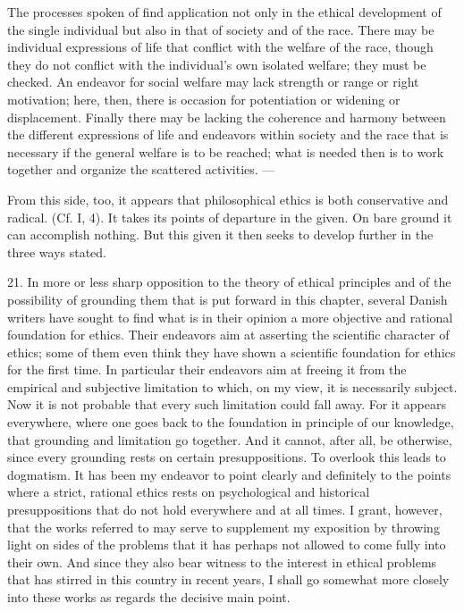 \documentclass[12pt,a4paper,openany]{book}
\newcommand{\opage}[1]{\marginnote{\footnotesize\textit{[#1]}}}
\begin{document}
The processes spoken of find application not only in the ethical development of the single
individual but also in that of society and of the race. There may be individual expressions of life
that conflict with the welfare of the race, though they do not conflict with the individual's own
\opage{66}isolated welfare; they must be checked. An endeavor for social welfare may lack strength or range
or right motivation; here, then, there is occasion for potentiation or widening or displacement.
Finally there may be lacking the coherence and harmony between the different expressions of life and
endeavors within society and the race that is necessary if the general welfare is to be reached; what
is needed then is to work together and organize the scattered activities. ---

From this side, too, it appears that philosophical ethics is both conservative and radical. (Cf. I,
4). It takes its points of departure in the given. On bare ground it can accomplish nothing. But this
given it then seeks to develop further in the three ways stated.

21. In more or less sharp opposition to the theory of ethical principles and of the possibility of
grounding them that is put forward in this chapter, several Danish writers have sought to find what is
in their opinion a more objective and rational foundation for ethics. Their endeavors aim at asserting
the scientific character of ethics; some of them even think they have shown a scientific foundation
for ethics for the first time. In particular their endeavors aim at freeing it from the empirical and
subjective limitation to which, on my view, it is necessarily subject. Now it is not probable that
every such limitation could fall away. For it appears everywhere, where one goes back to the
foundation in principle of our knowledge, that grounding and limitation go together. And it cannot,
after all, be otherwise, since every grounding rests on certain presuppositions. To overlook this
leads to dogmatism. It has been my endeavor to point clearly and definitely to the points where a
strict, rational ethics rests on psychological and historical presuppositions that do not hold
everywhere and at all times. I grant, however, that the works referred to may serve to supplement my
exposition by throwing light on sides of the problems that it has perhaps not allowed to come fully
into their own. And since they also bear witness to the interest in ethical problems that has stirred
in this country in recent
\opage{67}years, I shall go somewhat more closely into these works as regards the decisive main point.
\end{document}

